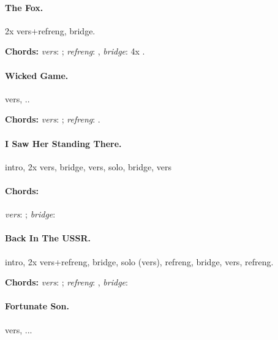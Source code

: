 \documentclass[%
twoside,                 %
draft,                   %
final,                   %
10pt]{article}
\begin{document}
\paragraph{The Fox.}
2x vers+refreng, bridge.

\textbf{Chords:} \emph{vers}: ; \emph{refreng}: , \emph{bridge}: 4x
.




\paragraph{Wicked Game.}
vers, ..

\textbf{Chords:} \emph{vers}: ; \emph{refreng}: .





\paragraph{I Saw Her Standing There.}
intro, 2x vers, bridge, vers, solo, bridge, vers

\paragraph{Chords:}
\emph{vers}: ; \emph{bridge}: 










\paragraph{Back In The USSR.}
intro, 2x vers+refreng, bridge, solo (vers), refreng, bridge, vers, refreng.

\textbf{Chords:} \emph{vers}: ; \emph{refreng}: ,
\emph{bridge}: 





\paragraph{Fortunate Son.}
vers, ...
\end{document}
